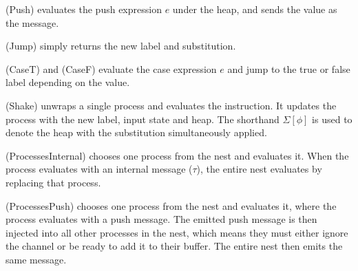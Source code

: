 (Push) evaluates the push expression $e$ under the heap, and sends the value as the message.

(Jump) simply returns the new label and substitution.

(CaseT) and (CaseF) evaluate the case expression $e$ and jump to the true or false label depending on the value.

(Shake) unwraps a single process and evaluates the instruction.
It updates the process with the new label, input state and heap.
The shorthand $\Sigma[\phi]$ is used to denote the heap with the substitution simultaneously applied.

(ProcessesInternal) chooses one process from the nest and evaluates it.
When the process evaluates with an internal message ($\tau$), the entire nest evaluates by replacing that process.

(ProcessesPush) chooses one process from the nest and evaluates it, where the process evaluates with a push message.
The emitted push message is then injected into all other processes in the nest, which means they must either ignore the channel or be ready to add it to their buffer.
The entire nest then emits the same message.


